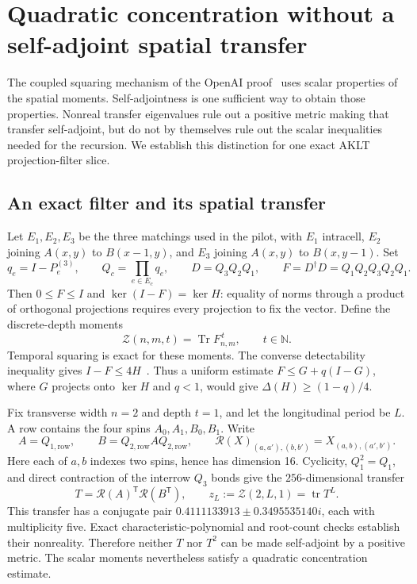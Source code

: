 \documentclass[11pt]{article}
\newcommand{\Tr}{\operatorname{Tr}}
\newcommand{\tr}{\operatorname{tr}}
\begin{document}
\section{Quadratic concentration without a self-adjoint spatial transfer}
\label{sec:nonreal}

The coupled squaring mechanism of the OpenAI proof~\cite{oai,main} uses
scalar properties of the spatial moments. Self-adjointness is one
sufficient way to obtain those properties. Nonreal transfer eigenvalues
rule out a positive metric making that transfer self-adjoint, but do not
by themselves rule out the scalar inequalities needed for the recursion.
We establish this distinction for one exact AKLT projection-filter slice.

\subsection{An exact filter and its spatial transfer}

Let \(E_1,E_2,E_3\) be the three matchings used in the pilot, with
\(E_1\) intracell, \(E_2\) joining \(A(x,y)\) to \(B(x-1,y)\),
and \(E_3\) joining \(A(x,y)\) to \(B(x,y-1)\). Set
\[
	q_e=I-P_e^{(3)},\qquad Q_c=\prod_{e\in E_c}q_e,\qquad
	D=Q_3Q_2Q_1,\qquad F=D^\dagger D=Q_1Q_2Q_3Q_2Q_1.
\]
Then \(0\le F\le I\) and \(\ker(I-F)=\ker H\): equality of
norms through a product of orthogonal projections requires every
projection to fix the vector. Define the discrete-depth moments
\[
	\mathcal Z(n,m,t)=\Tr F_{n,m}^{\,t},\qquad t\in\mathbb N.
\]
Temporal squaring is exact for these moments. The converse detectability
inequality gives \(I-F\le4H\)~\cite{aav}. Thus a uniform estimate
\(F\le G+q(I-G)\), where \(G\) projects onto \(\ker H\) and
\(q<1\), would give \(\Delta(H)\ge(1-q)/4\).

Fix transverse width \(n=2\) and depth \(t=1\), and let the
longitudinal period be \(L\). A row contains the four spins
\(A_0,A_1,B_0,B_1\). Write
\[
	A=Q_{1,\mathrm{row}},\qquad
	B=Q_{2,\mathrm{row}}A Q_{2,\mathrm{row}},\qquad
	\mathcal R(X)_{(a,a'),(b,b')}=X_{(a,b),(a',b')}.
\]
Here each of \(a,b\) indexes two spins, hence has dimension 16.
Cyclicity, \(Q_1^2=Q_1\), and direct contraction of the interrow
\(Q_3\) bonds give the \(256\)-dimensional transfer
\begin{equation}
	T=\mathcal R(A)^{\mathsf T}\mathcal R(B^{\mathsf T}),\qquad
	z_L:=\mathcal Z(2,L,1)=\tr T^L.
	\label{eq:filter-row}
\end{equation}
This transfer has a conjugate pair
\(0.4111133913\pm0.3495535140i\), each with multiplicity five.
Exact characteristic-polynomial and root-count checks establish their
nonreality. Therefore neither \(T\) nor \(T^2\) can be made
self-adjoint by a positive metric. The scalar moments nevertheless
satisfy a quadratic concentration estimate.
\end{document}

